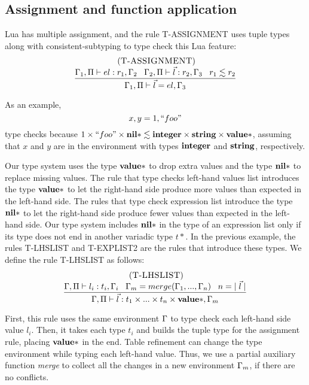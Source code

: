 \subsection{Assignment and function application}
\label{sec:assignment}

Lua has multiple assignment, and the rule \textsc{T-ASSIGNMENT} uses
tuple types along with consistent-subtyping to type check this Lua feature:
\[
\begin{array}{c}
\; (\textsc{T-ASSIGNMENT})\\
\begin{array}{c}
\dfrac{\Gamma_{1}, \Pi \vdash el:r_{1}, \Gamma_{2} \;\;\;
       \Gamma_{2}, \Pi \vdash \vec{l}:r_{2}, \Gamma_{3} \;\;\;
       r_{1} \lesssim r_{2}}
      {\Gamma_{1}, \Pi \vdash \vec{l} = el,\Gamma_{3}}
\end{array}
\end{array}
\]

As an example,
\[
x, y = 1, ``foo"
\]
type checks because
$1 \times ``foo" \times \mathbf{nil}{*} \lesssim \mathbf{integer} \times \mathbf{string} \times \mathbf{value}{*}$,
assuming that $x$ and $y$ are in the environment with
types $\mathbf{integer}$ and $\mathbf{string}$, respectively.

Our type system uses the type $\mathbf{value}{*}$ to drop extra values
and the type $\mathbf{nil}{*}$ to replace missing values.
The rule that type checks left-hand values list introduces the type
$\mathbf{value}{*}$ to let the right-hand side produce more values than
expected in the left-hand side.
The rules that type check expression list introduce the type
$\mathbf{nil}{*}$ to let the right-hand side produce fewer values than
expected in the left-hand side.
Our type system includes $\mathbf{nil}{*}$ in the type of an expression list only
if its type does not end in another variadic type $t{*}$.
In the previous example, the rules \textsc{T-LHSLIST} and \textsc{T-EXPLIST2}
are the rules that introduce these types.
We define the rule \textsc{T-LHSLIST} as follows:
\[
\begin{array}{c}
\; (\textsc{T-LHSLIST})\\
\dfrac{\Gamma, \Pi \vdash l_{i}:t_{i}, \Gamma_{i} \;\;\;
       \Gamma_{m} = merge(\Gamma_{1}, ..., \Gamma_{n}) \;\;\;
       n = |\;\vec{l}\;|}
      {\Gamma, \Pi \vdash \vec{l}:t_{1} \times ... \times t_{n} \times \mathbf{value}{*}, \Gamma_{m}}
\end{array}
\]

First, this rule uses the same environment $\Gamma$ to type check each
left-hand side value $l_{i}$.
Then, it takes each type $t_{i}$ and builds the tuple type for
the assignment rule, placing $\mathbf{value}{*}$ in the end.
Table refinement can change the type environment while typing each left-hand value.
Thus, we use a partial auxiliary function \emph{merge} to collect
all the changes in a new environment $\Gamma_{m}$, if there are no conflicts.

